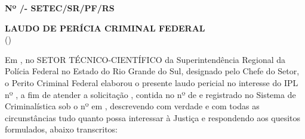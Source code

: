 \noindent\textbf{\pfdoctype\space Nº \pfdocnum/\pfdocyear\space - SETEC/SR/PF/RS}

\begin{center}
	\textbf{LAUDO DE PERÍCIA CRIMINAL FEDERAL}\\
	(\pfdocsubtype)
\end{center}

Em 
\pfdocdate,	no SETOR TÉCNICO-CIENTÍFICO da Superintendência
Regional da Polícia Federal no Estado do Rio Grande do Sul, designado pelo Chefe do Setor,	o Perito Criminal Federal 
\pfauthor\space elaborou o presente laudo pericial no interesse do IPL nº \pfipl, a fim de atender a solicitação 
\pfclient, contida no 
\pfexptype\space nº \pfexpnum\space de \pfexpdate\space	e registrado no Sistema de Criminalística sob o nº 
\pfregnum\space em \pfregdate, descrevendo com verdade e com todas as circunstâncias tudo quanto possa interessar à Justiça e respondendo aos	quesitos formulados, abaixo transcritos:

